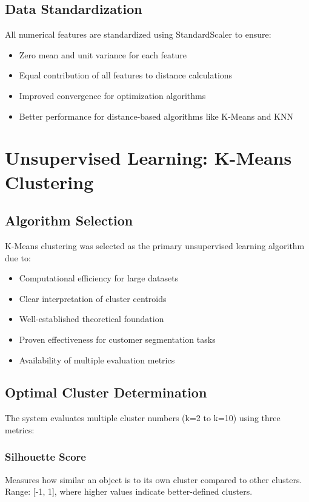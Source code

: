 \documentclass[12pt,a4paper]{report}
\begin{document}
\subsection{Data Standardization}
\noindent All numerical features are standardized using StandardScaler to ensure:
\begin{itemize}
    \item Zero mean and unit variance for each feature
    \item Equal contribution of all features to distance calculations
    \item Improved convergence for optimization algorithms
    \item Better performance for distance-based algorithms like K-Means and KNN
\end{itemize}

\section{Unsupervised Learning: K-Means Clustering}

\subsection{Algorithm Selection}
\noindent K-Means clustering was selected as the primary unsupervised learning algorithm due to:
\begin{itemize}
    \item Computational efficiency for large datasets
    \item Clear interpretation of cluster centroids
    \item Well-established theoretical foundation
    \item Proven effectiveness for customer segmentation tasks
    \item Availability of multiple evaluation metrics
\end{itemize}

\subsection{Optimal Cluster Determination}
\noindent The system evaluates multiple cluster numbers (k=2 to k=10) using three metrics:

\subsubsection{Silhouette Score}
Measures how similar an object is to its own cluster compared to other clusters. Range: [-1, 1], where higher values indicate better-defined clusters.
\end{document}
